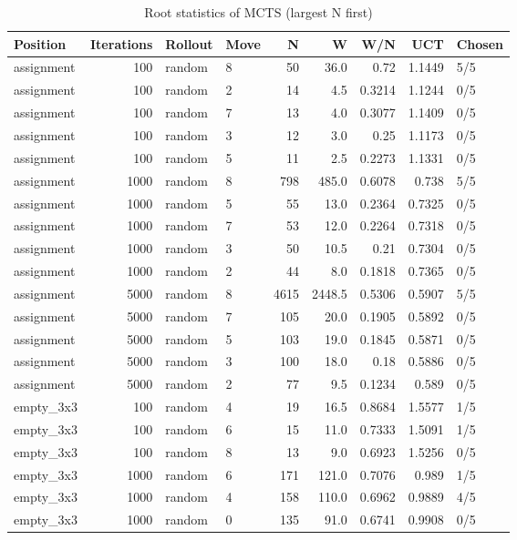 \begin{table}[!t]
\centering
\caption{Root statistics of MCTS (largest N first)}
\label{tab:root_stats}
\small
\begin{tabular}{lrllrrrrl}
\toprule
Position & Iterations & Rollout & Move & N & W & W/N & UCT & Chosen \\
\midrule
assignment & 100 & random & 8 & 50 & 36.0 & 0.72 & 1.1449 & 5/5 \\
assignment & 100 & random & 2 & 14 & 4.5 & 0.3214 & 1.1244 & 0/5 \\
assignment & 100 & random & 7 & 13 & 4.0 & 0.3077 & 1.1409 & 0/5 \\
assignment & 100 & random & 3 & 12 & 3.0 & 0.25 & 1.1173 & 0/5 \\
assignment & 100 & random & 5 & 11 & 2.5 & 0.2273 & 1.1331 & 0/5 \\
assignment & 1000 & random & 8 & 798 & 485.0 & 0.6078 & 0.738 & 5/5 \\
assignment & 1000 & random & 5 & 55 & 13.0 & 0.2364 & 0.7325 & 0/5 \\
assignment & 1000 & random & 7 & 53 & 12.0 & 0.2264 & 0.7318 & 0/5 \\
assignment & 1000 & random & 3 & 50 & 10.5 & 0.21 & 0.7304 & 0/5 \\
assignment & 1000 & random & 2 & 44 & 8.0 & 0.1818 & 0.7365 & 0/5 \\
assignment & 5000 & random & 8 & 4615 & 2448.5 & 0.5306 & 0.5907 & 5/5 \\
assignment & 5000 & random & 7 & 105 & 20.0 & 0.1905 & 0.5892 & 0/5 \\
assignment & 5000 & random & 5 & 103 & 19.0 & 0.1845 & 0.5871 & 0/5 \\
assignment & 5000 & random & 3 & 100 & 18.0 & 0.18 & 0.5886 & 0/5 \\
assignment & 5000 & random & 2 & 77 & 9.5 & 0.1234 & 0.589 & 0/5 \\
empty\_3x3 & 100 & random & 4 & 19 & 16.5 & 0.8684 & 1.5577 & 1/5 \\
empty\_3x3 & 100 & random & 6 & 15 & 11.0 & 0.7333 & 1.5091 & 1/5 \\
empty\_3x3 & 100 & random & 8 & 13 & 9.0 & 0.6923 & 1.5256 & 0/5 \\
empty\_3x3 & 1000 & random & 6 & 171 & 121.0 & 0.7076 & 0.989 & 1/5 \\
empty\_3x3 & 1000 & random & 4 & 158 & 110.0 & 0.6962 & 0.9889 & 4/5 \\
empty\_3x3 & 1000 & random & 0 & 135 & 91.0 & 0.6741 & 0.9908 & 0/5 \\

\end{tabular}
\end{table}
